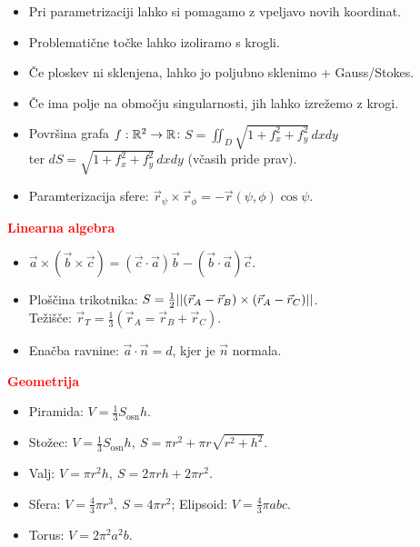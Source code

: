\documentclass[a4paper,oneside,8pt,landscape]{extarticle}
\begin{document}
\begin{multicols*}{3}
\begin{itemize}
    \item Pri parametrizaciji lahko si pomagamo z vpeljavo novih koordinat.
    \item Problematične točke lahko izoliramo s krogli.
    \item Če ploskev ni sklenjena, lahko jo poljubno sklenimo + Gauss/Stokes.
    \item Če ima polje na območju singularnosti, jih lahko izrežemo z krogi.
    \item Površina grafa \(f: \mathbb{R}^2 \to \mathbb{R}\): \(S = \iint_D \sqrt{1 + f_x^2+f_y^2}\, dxdy\)\\ ter \(dS = \sqrt{1 + f_x^2+f_y^2}\, dxdy\) (včasih pride prav).
    \item Paramterizacija sfere: \(\vec{r}_\psi \times \vec{r}_\phi = - \vec{r}(\psi, \phi) \cos\psi.\)
\end{itemize}
%
%
\textbf{\textcolor{red}{Linearna algebra}}
\begin{itemize}
    \item \(\vec{a} \times (\vec{b} \times \vec{c}) = (\vec{c} \cdot \vec{a}) \vec{b} - (\vec{b} \cdot \vec{a}) \vec{c}\).
    \item Ploščina trikotnika: \(S = \frac{1}{2} ||(\vec{r}_A - \vec{r}_B) \times (\vec{r}_A - \vec{r}_C)||\).\\ Težišče: \(\vec{r}_T = \frac{1}{3}(\vec{r}_A = \vec{r}_B + \vec{r}_C)\).
    \item Enačba ravnine: \(\vec{a} \cdot \vec{n} = d\), kjer je \(\vec{n}\) normala.
\end{itemize}
%
%
\textbf{\textcolor{red}{Geometrija}}
\begin{itemize}
    \item Piramida: \(V = \frac{1}{3}S_\text{osn} h\).
    \item Stožec: \(V = \frac{1}{3}S_\text{osn} h, \ S = \pi r^2 + \pi r \sqrt{r^2+h^2}\).
    \item Valj: \(V = \pi r^2 h, \ S = 2\pi rh+2\pi r^2\).
    \item Sfera: \(V = \frac{4}{3} \pi r^3, \ S = 4 \pi r^2\); Elipsoid: \(V = \frac{4}{3} \pi abc\).
    \item Torus: \(V = 2\pi^2 a^2 b\).
\end{itemize}


\end{multicols*}
\end{document}
